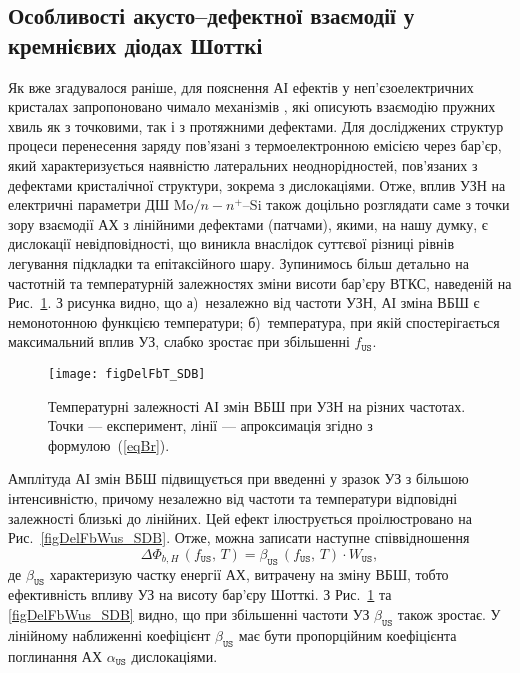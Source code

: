 \subsection{Особливості акусто--дефектної взаємодії у кремнієвих діодах Шотткі}

Як вже згадувалося раніше, для пояснення АІ ефектів у неп'єзоелектричних кристалах
запропоновано чимало механізмів \cite{Pavlovich,Korotchenkov1995,MirzadeJAP2011,PELESHCHAK:UPJ2016,Krevchik,MirzadeJAP2005,Davletova2008,OstrovKor92},
які описують взаємодію пружних хвиль як з точковими, так і з протяжними дефектами.
Для досліджених структур процеси перенесення заряду пов'язані з термоелектронною емісією
через бар'єр, який характеризується наявністю латеральних неоднорідностей, пов'язаних з дефектами
кристалічної структури, зокрема з дислокаціями.
Отже, вплив УЗН на електричні параметри ДШ Mo$/n-n^+$--Si також доцільно розглядати саме з точки зору
взаємодії АХ з лінійними дефектами (патчами), якими, на нашу думку, є дислокації невідповідності, що
виникла внаслідок суттєвої різниці рівнів легування підкладки та епітаксійного шару.
Зупинимось більш детально на частотній та температурній залежностях зміни висоти бар'єру ВТКС,
наведеній на Рис.~\ref{figDelFbT_SDB}.
З рисунка видно, що
а)~незалежно від частоти УЗН, АІ зміна ВБШ є немонотонною функцією температури;
б)~температура, при якій спостерігається максимальний вплив УЗ, слабко зростає при збільшенні $f_\mathtt{US}$.

\begin{figure}
\center
\texttt{[image: figDelFbT\_SDB]}
\caption{\label{figDelFbT_SDB}
Температурні залежності АІ змін ВБШ при УЗН на різних частотах.
Точки --- експеримент,
лінії --- апроксимація згідно з формулою~(\ref{eqBr}).
}%
\end{figure}

Амплітуда АІ змін ВБШ підвищується при введенні у зразок УЗ з більшою інтенсивністю, причому незалежно від частоти та температури
відповідні залежності близькі до лінійних.
Цей ефект ілюструється проілюстровано на Рис.~\ref{figDelFbWus_SDB}.
Отже, можна записати наступне співвідношення
\begin{equation}
\label{eqBt}
\Delta\Phi_{b,H}\,(f_\mathtt{US},\,T)=\beta_\mathtt{US}\,(f_\mathtt{US},\,T)\cdot W_\mathtt{US},
\end{equation}
де
$\beta_\mathtt{US}$ характеризую частку енергії АХ, витрачену на зміну ВБШ, тобто
ефективність впливу УЗ на висоту бар'єру Шотткі.
З Рис.~\ref{figDelFbT_SDB} та \ref{figDelFbWus_SDB} видно, що при збільшенні частоти УЗ $\beta_\mathtt{US}$ також зростає.
У лінійному наближенні коефіцієнт $\beta_\mathtt{US}$ має бути пропорційним коефіцієнта поглинання АХ $\alpha_\mathtt{US}$ дислокаціями.

